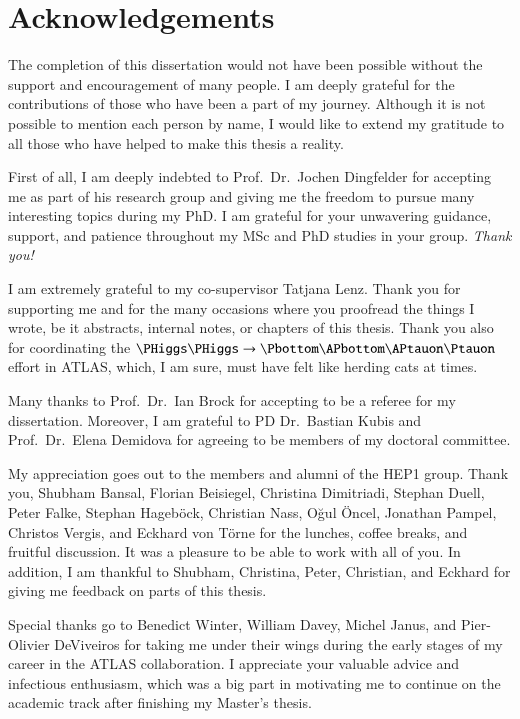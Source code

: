 \chapter*{Acknowledgements}

The completion of this dissertation would not have been possible without the
support and encouragement of many people. I am deeply grateful for the
contributions of those who have been a part of my journey. Although it is not
possible to mention each person by name, I would like to extend my gratitude to
all those who have helped to make this thesis a reality.

First of all, I am deeply indebted to Prof.\ Dr.\ Jochen Dingfelder for
accepting me as part of his research group and giving me the freedom to pursue
many interesting topics during my PhD. I am grateful for your unwavering
guidance, support, and patience throughout my MSc and PhD studies in your
group. \emph{Thank you!}

I am extremely grateful to my co-supervisor Tatjana Lenz. Thank you for
supporting me and for the many occasions where you proofread the things I
wrote, be it abstracts, internal notes, or chapters of this thesis. Thank you
also for coordinating the $\HH \to \bbtautau$ effort in ATLAS, which, I am sure,
must have felt like herding cats at times.

Many thanks to Prof.\ Dr.\ Ian Brock for accepting to be a referee for my
dissertation. Moreover, I am grateful to PD Dr.\ Bastian Kubis and Prof.\ Dr.\
Elena Demidova for agreeing to be members of my doctoral committee.

My appreciation goes out to the members and alumni of the \textsc{HEP1}
group. Thank you, Shubham Bansal, Florian Beisiegel, Christina Dimitriadi,
Stephan Duell, Peter Falke, Stephan Hageböck, Christian Nass, Oğul Öncel,
Jonathan Pampel, Christos Vergis, and Eckhard von Törne for the lunches, coffee
breaks, and fruitful discussion. It was a pleasure to be able to work with all
of you. In addition, I am thankful to Shubham, Christina, Peter, Christian, and
Eckhard for giving me feedback on parts of this thesis.

Special thanks go to Benedict Winter, William Davey, Michel Janus, and
Pier-Olivier DeViveiros for taking me under their wings during the early stages
of my career in the ATLAS collaboration. I appreciate your valuable advice and
infectious enthusiasm, which was a big part in motivating me to continue on the
academic track after finishing my Master's thesis.

